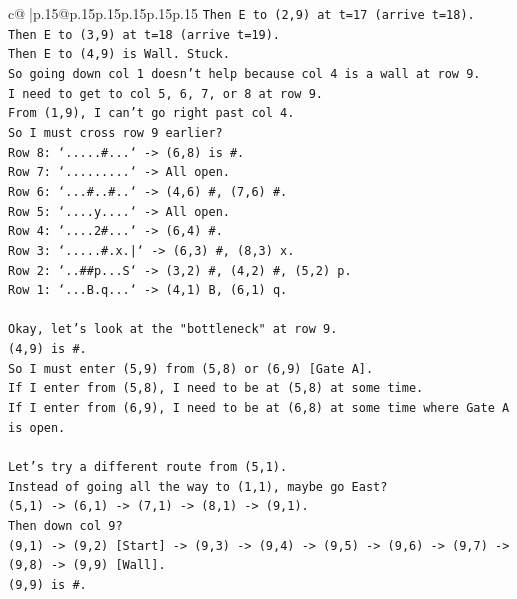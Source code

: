 \documentclass{article}
\begin{document}
{\begin{supertabular}{c@{$\;$}|p{.15\linewidth}@{}p{.15\linewidth}p{.15\linewidth}p{.15\linewidth}p{.15\linewidth}p{.15\linewidth}}
{{{\texttt{Then E to (2,9) at t=17 (arrive t=18).} \\
\texttt{Then E to (3,9) at t=18 (arrive t=19).} \\
\texttt{Then E to (4,9) is Wall. Stuck.} \\
\texttt{So going down col 1 doesn't help because col 4 is a wall at row 9.} \\
\texttt{I need to get to col 5, 6, 7, or 8 at row 9.} \\
\texttt{From (1,9), I can't go right past col 4.} \\
\texttt{So I must cross row 9 earlier?} \\
\texttt{Row 8: `.....\#...` {-}> (6,8) is \#.} \\
\texttt{Row 7: `.........` {-}> All open.} \\
\texttt{Row 6: `...\#..\#..` {-}> (4,6) \#, (7,6) \#.} \\
\texttt{Row 5: `....y....` {-}> All open.} \\
\texttt{Row 4: `....2\#...` {-}> (6,4) \#.} \\
\texttt{Row 3: `.....\#.x.|` {-}> (6,3) \#, (8,3) x.} \\
\texttt{Row 2: `..\#\#p...S` {-}> (3,2) \#, (4,2) \#, (5,2) p.} \\
\texttt{Row 1: `...B.q...` {-}> (4,1) B, (6,1) q.} \\
\\ 
\texttt{Okay, let's look at the "bottleneck" at row 9.} \\
\texttt{(4,9) is \#.} \\
\texttt{So I must enter (5,9) from (5,8) or (6,9) {[}Gate A{]}.} \\
\texttt{If I enter from (5,8), I need to be at (5,8) at some time.} \\
\texttt{If I enter from (6,9), I need to be at (6,8) at some time where Gate A is open.} \\
\\ 
\texttt{Let's try a different route from (5,1).} \\
\texttt{Instead of going all the way to (1,1), maybe go East?} \\
\texttt{(5,1) {-}> (6,1) {-}> (7,1) {-}> (8,1) {-}> (9,1).} \\
\texttt{Then down col 9?} \\
\texttt{(9,1) {-}> (9,2) {[}Start{]} {-}> (9,3) {-}> (9,4) {-}> (9,5) {-}> (9,6) {-}> (9,7) {-}> (9,8) {-}> (9,9) {[}Wall{]}.} \\
\texttt{(9,9) is \#.} \\
}}}
\end{supertabular}}
\end{document}
